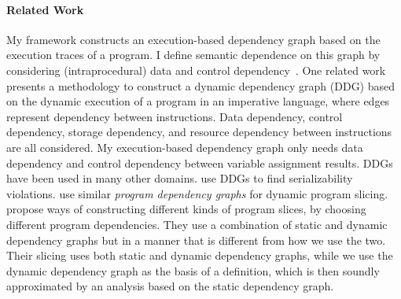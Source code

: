 
 \paragraph*{Related Work}
 {
My framework constructs an execution-based dependency graph based on the execution traces of a program. I define semantic dependence on this graph by considering (intraprocedural) data and control dependency~\cite{bilardi1996framework,cytron1991efficiently,pollock1989incremental}. 
One related work 
\cite{austin1992dynamic} presents a methodology to construct a dynamic dependency graph (DDG) based on the dynamic execution of a program in an imperative language, where edges represent dependency between instructions. Data dependency, control dependency, storage dependency, and resource dependency between instructions are all considered. My execution-based dependency graph only needs data dependency and control dependency between variable assignment results. 
%
DDGs have been used in many other domains. \cite{nagar2018automated} use DDGs to find serializability violations. \cite{hammer2006dynamic} use similar \emph{program dependency graphs} \cite{ferrante1987program} for dynamic program slicing.
\cite{mastroeni2008data} propose ways of constructing different kinds of program slices, by choosing different program dependencies. 
They use a combination of 
static and dynamic dependency graphs but in a manner that is different from how we use the two. Their slicing uses both static and dynamic dependency graphs, while we use the dynamic dependency graph as the basis of a definition, which is then soundly approximated by an analysis based on the static dependency graph.}

